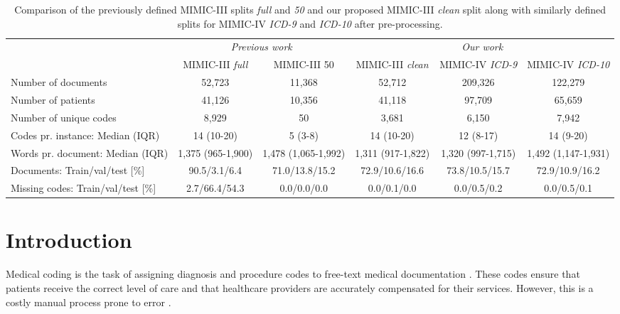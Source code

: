 \documentclass[anonymous=false, sigconf=true, review=false, natbib=true]{acmart}
\begin{document}
\begin{table*}[t!]
    \centering
    \caption{Comparison of the previously defined MIMIC-III splits \textit{full} and \textit{50} \cite{mullenbachExplainablePredictionMedical2018} and our proposed MIMIC-III \textit{clean} split along with similarly defined splits for MIMIC-IV \textit{ICD-9} and \textit{ICD-10} after pre-processing.}
    \label{tab:subsets}
    \begin{tabular}{lccccc}
        \toprule
        & \multicolumn{2}{c}{\textit{Previous work}} & \multicolumn{3}{c}{\textit{Our work}} \\
        \cmidrule(lr){2-3}\cmidrule(lr){4-6}
        & {MIMIC-III \textit{full}} & {MIMIC-III 50}  & {MIMIC-III \textit{clean}}  & {MIMIC-IV \textit{ICD-9}}  & {MIMIC-IV \textit{ICD-10}}\\
        \midrule
        Number of documents  & 52,723 & 11,368 &  52,712 & 209,326 & 122,279 \\
        Number of patients & 41,126 & 10,356 & 41,118 & 97,709 & 65,659 \\
        Number of unique codes  & 8,929 & 50  & 3,681 & 6,150 & 7,942\\
        Codes pr. instance: Median (IQR)    & 14 (10-20) & 5 (3-8) & 14 (10-20) & 12 (8-17) & 14 (9-20)\\
        Words pr. document: Median (IQR) & 1,375 (965-1,900) & 1,478 (1,065-1,992) & 1,311 (917-1,822) & 1,320 (997-1,715) & 1,492 (1,147-1,931)\\
        Documents: Train/val/test [\%] & 90.5/3.1/6.4 & 71.0/13.8/15.2 & 72.9/10.6/16.6  & 73.8/10.5/15.7& 72.9/10.9/16.2  \\
        Missing codes: Train/val/test [\%] & 2.7/66.4/54.3 & 0.0/0.0/0.0 & 0.0/0.1/0.0 & 0.0/0.5/0.2 & 0.0/0.5/0.1\\
        \bottomrule
    \end{tabular}
\end{table*}

\section{Introduction}

Medical coding is the task of assigning diagnosis and procedure codes to free-text medical documentation \cite{dongAutomatedClinicalCoding2022,tengReviewDeepNeural2022}.
These codes ensure that patients receive the correct level of care and that healthcare providers are accurately compensated for their services. However, this is a costly manual process prone to error \cite{tsengAdministrativeCostsAssociated2018, omalleyMeasuringDiagnosesICD2005, burnsSystematicReviewDischarge2012}.
\end{document}
